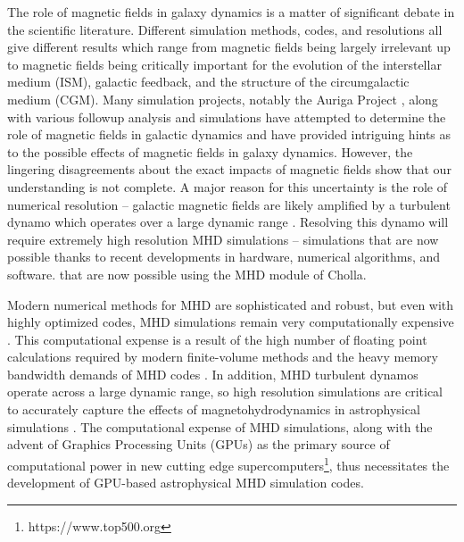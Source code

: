 The role of magnetic fields in galaxy dynamics is a matter of significant debate in the scientific literature. Different simulation methods, codes, and resolutions all give different results which range from magnetic fields being largely irrelevant up to magnetic fields being critically important for the evolution of the interstellar medium (ISM), galactic feedback, and the structure of the circumgalactic medium (CGM)\citep{pakmor_faraday_2018,pakmor_simulations_2013,pakmor_magnetic_2017,pakmor_magnetizing_2020,ntormousi_dynamo_2020,van_de_voort_effect_2021}. Many simulation projects, notably the Auriga Project \citep{grand_auriga_2017}, along with various followup analysis and simulations \citep{pakmor_faraday_2018,pakmor_simulations_2013,pakmor_magnetic_2017,pakmor_magnetizing_2020,ntormousi_dynamo_2020,van_de_voort_effect_2021} have attempted to determine the role of magnetic fields in galactic dynamics and have provided intriguing hints as to the possible effects of magnetic fields in galaxy dynamics. However, the lingering disagreements about the exact impacts of magnetic fields show that our understanding is not complete. A major reason for this uncertainty is the role of numerical resolution -- galactic magnetic fields are likely amplified by a turbulent dynamo which operates over a large dynamic range \citep{beck_1996, carteret_2022, brandenburg_2022}. Resolving this dynamo will require extremely high resolution MHD simulations -- simulations that are now possible thanks to recent developments in hardware, numerical algorithms, and software. that are now possible using the MHD module of Cholla.

Modern numerical methods for MHD are sophisticated and robust, but even with highly optimized codes, MHD simulations remain very computationally expensive \cite{athena++_2020}. This computational expense is a result of the high number of floating point calculations required by modern finite-volume methods and the heavy memory bandwidth demands of MHD codes \citep{k_athena_2021}. In addition, MHD turbulent dynamos operate across a large dynamic range, so high resolution simulations are critical to accurately capture the effects of magnetohydrodynamics in astrophysical simulations \citep{galishnikova_tearing_2022, pakmor_simulations_2013}. The computational expense of MHD simulations, along with the advent of Graphics Processing Units (GPUs) as the primary source of computational power in new cutting edge supercomputers\footnote{https://www.top500.org}, thus necessitates the development of GPU-based astrophysical MHD simulation codes. 


